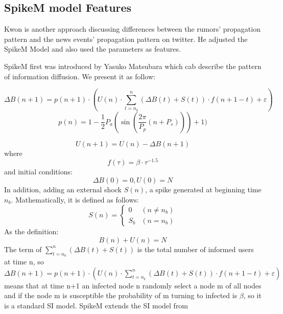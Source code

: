 \clearpage
\subsection{SpikeM model Features}
Kwon is another approach \cite{kwon2013prominent} discussing differences between the rumors' propagation pattern and the news events' propagation pattern on twitter. He adjusted the SpikeM Model and also used the parameters as features. 

SpikeM first was introduced by Yasuko Matsubara \cite{conf/kdd/MatsubaraSPLF12} which cab describe the pattern of information diffusion. We present it as follow:

\begin{equation}
\Delta B(n + 1) =p(n + 1)\cdot( U(n) \cdot  \sum ^n_{t=n_b}(\Delta B(t) + S(t))\cdot f(n+1-t) + \varepsilon )
\end{equation}
\begin{equation}
\label{periodic}
p(n) = 1-\frac{1}{2}P_a(\sin (\frac{2\pi}{P_p} (n+P_s)))+1)
\end{equation}

\begin{equation}
U(n + 1)=U(n)-\Delta {B(n + 1) }
\end{equation}
where
\begin{equation}
\label{decay}
f(\tau)=\beta \cdot \tau ^{-1.5}
\end{equation}
and initial conditions:
\begin{equation}
 \Delta B(0)=0 ,U(0) = N
\end{equation}
In addition, adding an external shock $S(n)$, a spike generated
at beginning time $n_b$. Mathematically, it is defined as follows:
\begin{equation}
\label{outs}
S(n) =\begin{cases}0 &(n \neq n_b)\\S_b  & (n =n_b)\end{cases} 
\end{equation}
As the definition: 
\begin{equation}
B(n) + U(n) = N
\end{equation}
The term of $\sum ^n_{t=n_b}(\Delta B(t) + S(t))$ is the total number of informed users at time n, so $\Delta B(n + 1) =p(n + 1)\cdot( U(n) \cdot  \sum ^n_{t=n_b}(\Delta B(t) + S(t))\cdot f(n+1-t) + \varepsilon )$ means that at time n+1 an infected node n randomly select a node m of all nodes and if the node m is susceptible the probability of m turning to infected is $\beta$, so it is a standard SI model. SpikeM extends the SI model from 


